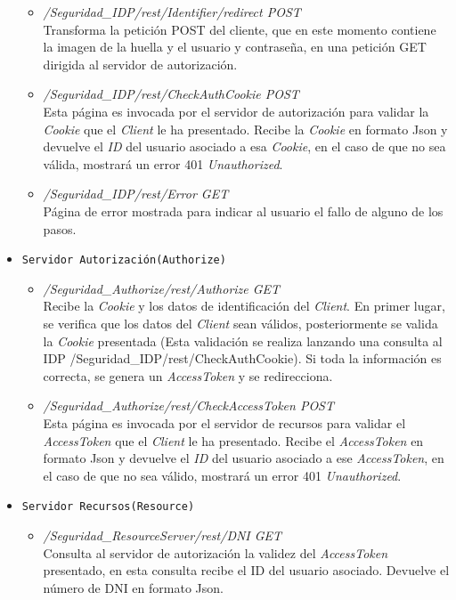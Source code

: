 \documentclass[a4,12pt,onecolum]{article}
\begin{document}
\begin{itemize}
\begin{itemize}
		\item \emph{/Seguridad\_IDP/rest/Identifier/redirect	POST} \\
		Transforma la petición POST del cliente, que en este momento contiene la imagen de la huella y el 				usuario y contraseña, en una petición GET dirigida al servidor de autorización.
		
		\item \emph{/Seguridad\_IDP/rest/CheckAuthCookie	POST} \\		
		Esta página es invocada por el servidor de autorización para validar la \emph{Cookie} que el 					\emph{Client} le ha presentado. Recibe la \emph{Cookie} en formato Json y devuelve el \emph{ID} del 			usuario asociado a esa \emph{Cookie}, en el caso de que no sea válida, mostrará un error 401 					\emph{Unauthorized}.		
		
		\item \emph{/Seguridad\_IDP/rest/Error	GET} \\
		Página de error mostrada para indicar al usuario el fallo de alguno de los pasos.
	\end{itemize}
	
\item \texttt{Servidor Autorización(Authorize)}
	\begin{itemize}
		\item \emph{/Seguridad\_Authorize/rest/Authorize	GET} \\
		Recibe la \emph{Cookie} y los datos de identificación del \emph{Client}. En primer lugar, se verifica 			que los datos del \emph{Client} sean válidos, posteriormente se valida la \emph{Cookie} presentada 				(Esta validación se realiza lanzando una consulta al IDP {/Seguridad\_IDP/rest/CheckAuthCookie}). 				Si toda la información es correcta, se genera un \emph{AccessToken} y se redirecciona.
		
		\item \emph{/Seguridad\_Authorize/rest/CheckAccessToken	POST} \\
		Esta página es invocada por el servidor de recursos para validar el \emph{AccessToken} que el 					\emph{Client} le ha presentado. Recibe el \emph{AccessToken} en formato Json y devuelve el \emph{ID} 			del	usuario asociado a ese \emph{AccessToken}, en el caso de que no sea válido, mostrará un error 401 			\emph{Unauthorized}.
	\end{itemize}
	
\item \texttt{Servidor Recursos(Resource)}
	\begin{itemize}
		\item \emph{/Seguridad\_ResourceServer/rest/DNI	GET} \\
		Consulta al servidor de autorización la validez del \emph{AccessToken} presentado, en esta consulta 			recibe el ID del usuario asociado. Devuelve el número de DNI en formato Json.
		

\end{itemize}
\end{itemize}
\end{document}
